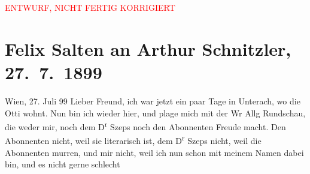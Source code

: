 
\begin{center}
            \textcolor{red}{ENTWURF, NICHT FERTIG KORRIGIERT}
                      \end{center}
            
         
         \renewcommand{\erwaehntePersonen}{Personen: Richard Beer-Hofmann, Leopold Geiringer, Paul Goldmann, Ottilie Salten, Moriz Szeps, Jakob Wassermann}
         \renewcommand{\erwaehnteInstitutionen}{Institutionen: Wiener Allgemeine Montagszeitung}
         \renewcommand{\erwaehnteOrte}{Orte: Unterach am Attersee, Wien}
         \renewcommand{\erwaehnteWerke}{Werke: ?? [Feuilleton über Paul Goldmann]}
               \section[Felix Salten an Arthur Schnitzler, 27. 7. 1899]{ Felix Salten an Arthur Schnitzler, 27. 7. 1899}\nopagebreak{}\rehead{ }\begin{ledgroupsized}[t]{13cm}\normalsize\beginnumbering \toendnotes[C]{\smallbreak\pagebreak[2]} 
\toendnotes[C]{\smallbreak}\pstart
           \raggedleft{}{\pb}Wien, 27. Juli 99\pend
           \pstart
           Lieber Freund, ich war jetzt ein paar Tage in Unterach, wo die Otti
               wohnt. Nun bin ich wieder hier, und plage mich mit der Wr Allg Rundschau, die weder mir, noch dem D\textsuperscript{r}{ }Szeps noch den Abonnenten Freude macht. Den
               Abonnenten nicht, weil sie literarisch ist, dem D\textsuperscript{r}{ }Szeps nicht, weil die Abonnenten murren, und
               mir nicht, weil ich nun schon mit meinem Namen dabei bin, und es nicht gerne schlecht

\end{ledgroupsized}
